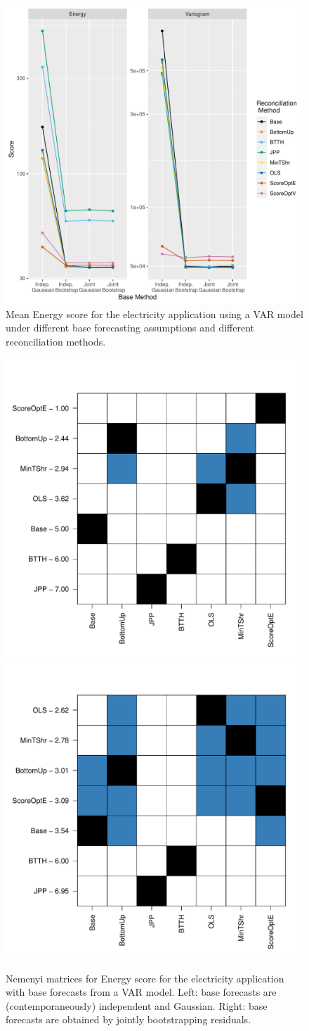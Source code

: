 \documentclass[a4paper,12pt]{article}
\theoremstyle{definition}
\begin{document}
\begin{figure}[!htb]
	\centering
	\includegraphics[width=.4\textheight]{Figs/meanenergyscore_VAR}
	\caption{Mean Energy score for the electricity application using a VAR model under different base forecasting assumptions and different reconciliation methods.}\label{fig:meanenergy_app_var}
\end{figure}

\begin{figure}[!htb]
	\centerline{\includegraphics[width=.3\textwidth]{Figs/nemenyi_ig_VAR.pdf}\includegraphics[width=.3\textwidth]{Figs/nemenyi_jb_VAR.pdf}}
	\caption{Nemenyi matrices for Energy score for the electricity application with base forecasts from a VAR model. Left: base forecasts are (contemporaneously) independent and Gaussian. Right: base forecasts are obtained by jointly bootstrapping residuals.}\label{fig:nem_app_var}
\end{figure}
\end{document}
